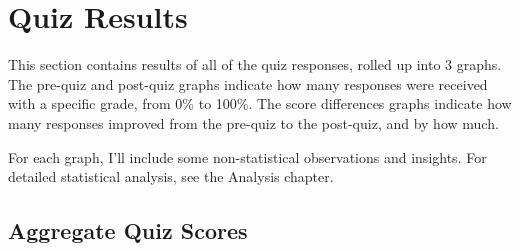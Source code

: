 	\clearpage

	\section{Quiz Results}
		This section contains results of all of the quiz responses, rolled up into 3 graphs. The pre-quiz and post-quiz graphs indicate how many responses were received with a specific grade, from 0\% to 100\%. The score differences graphs indicate how many responses improved from the pre-quiz to the post-quiz, and by how much.

		For each graph, I'll include some non-statistical observations and insights. For detailed statistical analysis, see the Analysis chapter.

		\subsection{Aggregate Quiz Scores}

